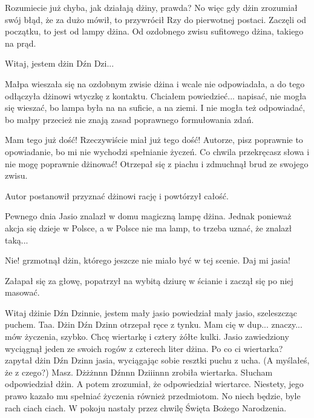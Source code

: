 Rozumiecie już chyba, jak działają dżiny, prawda? No więc gdy dżin zrozumiał swój błąd, że za dużo mówił, to przywrócił Rzy do pierwotnej postaci.
Zaczęli od początku, to jest od lampy dżina. Od ozdobnego zwisu sufitowego dżina, takiego na prąd.

\begin{dialogue}
	\ds{} Witaj, jestem dżin Dźn Dzi...
\end{dialogue}
Małpa wieszała się na ozdobnym zwisie dżina i wcale nie odpowiadała, a do tego odłączyła dżinowi wtyczkę z kontaktu.
Chciałem powiedzieć... napisać, nie mogła się wieszać, bo lampa była na na suficie, a na ziemi.
I nie mogła też odpowiadać, bo małpy przecież nie znają zasad poprawnego formułowania zdań.

\begin{dialogue}
	\ds{} Mam tego już dość! \dm{} Rzeczywiście miał już tego dość! \dm{} Autorze, pisz poprawnie to opowiadanie, bo mi nie wychodzi spełnianie życzeń. 
	Co chwila przekręcasz słowa i nie mogę poprawnie dżinować! Otrzepał się z piachu i zdmuchnął brud ze swojego zwisu.
\end{dialogue}

Autor postanowił przyznać dżinowi rację i powtórzył całość.
	
Pewnego dnia Jasio znalazł w domu magiczną lampę dżina.
Jednak ponieważ akcja się dzieje w Polsce, a w Polsce nie ma lamp, to trzeba uznać, że znalazł taką...

\begin{dialogue}
	\ds{} Nie! \dm{} grzmotnął dżin, którego jeszcze nie miało być w tej scenie. Daj mi jasia!
\end{dialogue}

Załapał się za głowę, popatrzył na wybitą dziurę w ścianie i zaczął się po niej masować.

\begin{dialogue}
	\ds{} Witaj dżinie Dźn Dzinnie, jestem mały jasio \dm{} powiedział mały jasio, szeleszcząc puchem.
	\ds{} Taa. \dm{}Dżin Dźn Dzinn otrzepał ręce z tynku. \dm{} Mam cię w dup... znaczy... mów życzenia, szybko.
	\ds{} Chcę wiertarkę i cztery żółte kulki. \dm{} Jasio zawiedziony wyciągnął jeden ze swoich rogów z czterech liter dżina.
	\ds{} Po co ci wiertarka? \dm{} zapytał dżin Dźn Dzinn jasia, wyciągając sobie resztki puchu z ucha. (A myślałeś, że z czego?) \dm{} Masz.
	\ds{} Dżżżnnn Dźnnn Dziiinnn \dm{} zrobiła wiertarka.
	\ds{} Słucham \dm{} odpowiedział dżin. A potem zrozumiał, że odpowiedział wiertarce. Niestety, jego prawo kazało mu spełniać życzenia również przedmiotom. \dm{} No niech będzie, byle rach ciach ciach. \dm{} W pokoju nastały przez chwilę Święta Bożego Narodzenia.
\end{dialogue}


